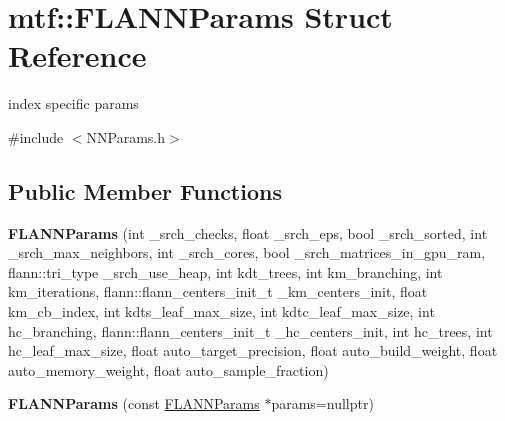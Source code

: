 \hypertarget{structmtf_1_1FLANNParams}{\section{mtf\-:\-:F\-L\-A\-N\-N\-Params Struct Reference}
\label{structmtf_1_1FLANNParams}
}


index specific params  




{\ttfamily \#include $<$N\-N\-Params.\-h$>$}

\subsection*{Public Member Functions}
\begin{DoxyCompactItemize}
\item 
\hypertarget{structmtf_1_1FLANNParams_a12c056566ef872131c3d1acd638e5676}{{\bfseries F\-L\-A\-N\-N\-Params} (int \-\_\-srch\-\_\-checks, float \-\_\-srch\-\_\-eps, bool \-\_\-srch\-\_\-sorted, int \-\_\-srch\-\_\-max\-\_\-neighbors, int \-\_\-srch\-\_\-cores, bool \-\_\-srch\-\_\-matrices\-\_\-in\-\_\-gpu\-\_\-ram, flann\-::tri\-\_\-type \-\_\-srch\-\_\-use\-\_\-heap, int kdt\-\_\-trees, int km\-\_\-branching, int km\-\_\-iterations, flann\-::flann\-\_\-centers\-\_\-init\-\_\-t \-\_\-km\-\_\-centers\-\_\-init, float km\-\_\-cb\-\_\-index, int kdts\-\_\-leaf\-\_\-max\-\_\-size, int kdtc\-\_\-leaf\-\_\-max\-\_\-size, int hc\-\_\-branching, flann\-::flann\-\_\-centers\-\_\-init\-\_\-t \-\_\-hc\-\_\-centers\-\_\-init, int hc\-\_\-trees, int hc\-\_\-leaf\-\_\-max\-\_\-size, float auto\-\_\-target\-\_\-precision, float auto\-\_\-build\-\_\-weight, float auto\-\_\-memory\-\_\-weight, float auto\-\_\-sample\-\_\-fraction)}\label{structmtf_1_1FLANNParams_a12c056566ef872131c3d1acd638e5676}

\item 
\hypertarget{structmtf_1_1FLANNParams_a1911ef6ffb1296f0b308e333783e487a}{{\bfseries F\-L\-A\-N\-N\-Params} (const \hyperlink{structmtf_1_1FLANNParams}{F\-L\-A\-N\-N\-Params} $\ast$params=nullptr)}\label{structmtf_1_1FLANNParams_a1911ef6ffb1296f0b308e333783e487a}

\end{DoxyCompactItemize}
